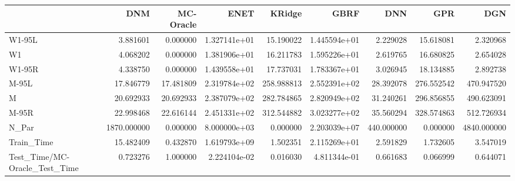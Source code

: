 \begin{tabular}{lrrrrrrrr}
\toprule
{} &          DNM &  MC-Oracle &          ENET &      KRidge &          GBRF &         DNN &         GPR &          DGN \\
\midrule
W1-95L                        &     3.881601 &   0.000000 &  1.327141e+01 &   15.190022 &  1.445594e+01 &    2.229028 &   15.618081 &     2.320968 \\
W1                            &     4.068202 &   0.000000 &  1.381906e+01 &   16.211783 &  1.595226e+01 &    2.619765 &   16.680825 &     2.654028 \\
W1-95R                        &     4.338750 &   0.000000 &  1.439558e+01 &   17.737031 &  1.783367e+01 &    3.026945 &   18.134885 &     2.892738 \\
M-95L                         &    17.846779 &  17.481809 &  2.319784e+02 &  258.988813 &  2.552391e+02 &   28.392078 &  276.552542 &   470.947520 \\
M                             &    20.692933 &  20.692933 &  2.387079e+02 &  282.784865 &  2.820949e+02 &   31.240261 &  296.856855 &   490.623091 \\
M-95R                         &    22.998468 &  22.616144 &  2.451331e+02 &  312.544882 &  3.023277e+02 &   35.560294 &  328.574863 &   512.726934 \\
N\_Par                         &  1870.000000 &   0.000000 &  8.000000e+03 &    0.000000 &  2.203039e+07 &  440.000000 &    0.000000 &  4840.000000 \\
Train\_Time                    &    15.482409 &   0.432870 &  1.619793e+09 &    1.502351 &  2.115269e+01 &    2.591829 &    1.732605 &     3.547019 \\
Test\_Time/MC-Oracle\_Test\_Time &     0.723276 &   1.000000 &  2.224104e-02 &    0.016030 &  4.811344e-01 &    0.661683 &    0.066999 &     0.644071 \\
\bottomrule
\end{tabular}
